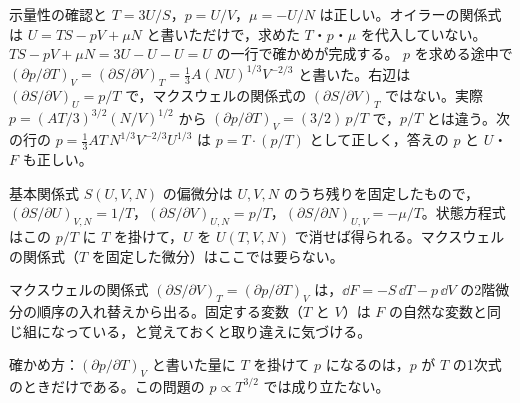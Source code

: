\begin{kotaeran}
   示量性の確認と $T=3U/S$，$p=U/V$，$\mu=-U/N$ は正しい。オイラーの関係式は $U=TS-pV+\mu N$ と書いただけで，求めた $T$・$p$・$\mu$ を代入していない。$TS-pV+\mu N=3U-U-U=U$ の一行で確かめが完成する。
   $p$ を求める途中で $(\partial p/\partial T)_{V}=(\partial S/\partial V)_{T}=\frac{1}{3}A(NU)^{1/3}V^{-2/3}$ と書いた。右辺は $(\partial S/\partial V)_{U}=p/T$ で，マクスウェルの関係式の $(\partial S/\partial V)_{T}$ ではない。実際 $p=(AT/3)^{3/2}(N/V)^{1/2}$ から $(\partial p/\partial T)_{V}=(3/2)\,p/T$ で，$p/T$ とは違う。次の行の $p=\frac{1}{3}AT\,N^{1/3}V^{-2/3}U^{1/3}$ は $p=T\cdot(p/T)$ として正しく，答えの $p$ と $U$・$F$ も正しい。
\end{kotaeran}
\begin{rikai}
  \item 基本関係式 $S(U,V,N)$ の偏微分は $U,V,N$ のうち残りを固定したもので，$(\partial S/\partial U)_{V,N}=1/T$，$(\partial S/\partial V)_{U,N}=p/T$，$(\partial S/\partial N)_{U,V}=-\mu/T$。状態方程式はこの $p/T$ に $T$ を掛けて，$U$ を $U(T,V,N)$ で消せば得られる。マクスウェルの関係式（$T$ を固定した微分）はここでは要らない。
  \item マクスウェルの関係式 $(\partial S/\partial V)_{T}=(\partial p/\partial T)_{V}$ は，$\dd F=-S\,\dd T-p\,\dd V$ の2階微分の順序の入れ替えから出る。固定する変数（$T$ と $V$）は $F$ の自然な変数と同じ組になっている，と覚えておくと取り違えに気づける。
  \item 確かめ方：$(\partial p/\partial T)_{V}$ と書いた量に $T$ を掛けて $p$ になるのは，$p$ が $T$ の1次式のときだけである。この問題の $p\propto T^{3/2}$ では成り立たない。
\end{rikai}
